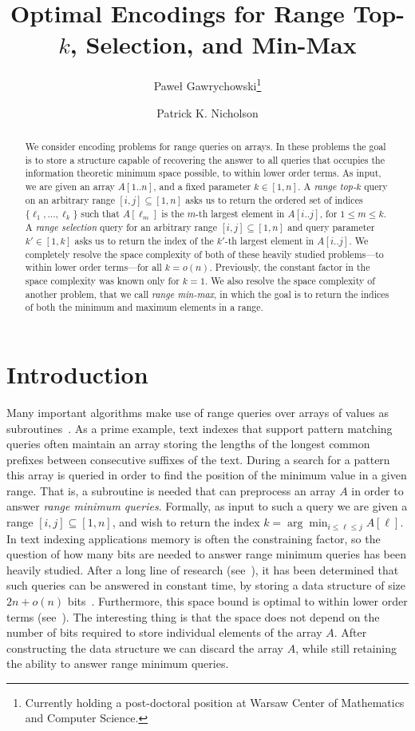 \documentclass[runningheads]{llncs}
\title{Optimal Encodings for Range Top-\texorpdfstring{$k$}{k},
  Selection, and Min-Max}
\author{Pawe{\l} Gawrychowski\inst{1}\thanks{Currently holding a post-doctoral position at Warsaw Center of Mathematics and Computer Science.}  \and Patrick K. Nicholson\inst{2}}
\institute{Institute of Informatics, University of Warsaw, Poland \and Max-Planck-Institut für Informatik, Saarbrücken, Germany}
\begin{document}
\pagestyle{plain}
\maketitle

\begin{abstract}
We consider encoding problems for range queries on arrays. In these
problems the goal is to store a structure capable of recovering the
answer to all queries that occupies the information theoretic minimum
space possible, to within lower order terms.  As input, we are given
an array $A[1..n]$, and a fixed parameter $k \in [1,n]$.  A
\emph{range top-$k$} query on an arbitrary range $[i,j] \subseteq
     [1,n]$ asks us to return the ordered set of indices $\{\ell_1,
     ..., \ell_{k}\}$ such that $A[\ell_m]$ is the $m$-th largest
     element in $A[i..j]$, for $1 \le m \le k$.  A \emph{range
       selection} query for an arbitrary range $[i,j] \subseteq [1,n]$
     and query parameter $k' \in [1,k]$ asks us to return the index of
     the $k'$-th largest element in $A[i..j]$.  We completely resolve
     the space complexity of both of these heavily studied
     problems---to within lower order terms---for all $k = o(n)$.
     Previously, the constant factor in the space complexity was known
     only for $k=1$.  We also resolve the space complexity of another
     problem, that we call \emph{range min-max}, in which the goal is
     to return the indices of both the minimum and maximum elements in
     a range.
\end{abstract}


\section{Introduction}

Many important algorithms make use of range queries over arrays of
values as subroutines~\cite{N13,S13}.  As a prime example, text
indexes that support pattern matching queries often maintain an array
storing the lengths of the longest common prefixes between consecutive
suffixes of the text.  During a search for a pattern this array is
queried in order to find the position of the minimum value in a given
range.  That is, a subroutine is needed that can preprocess an array
$A$ in order to answer \emph{range minimum queries}.  Formally, as
input to such a query we are given a range $[i,j] \subseteq [1,n]$,
and wish to return the index $k = \arg\min_{i \le \ell\le j}A[\ell]$.
In text indexing applications memory is often the constraining factor,
so the question of how many bits are needed to answer range minimum
queries has been heavily studied.  After a long line of research
(see~\cite{BFPSS05,S07}), it has been determined that such queries can
be answered in constant time, by storing a data structure of size $2n
+o(n)$ bits~\cite{FH11}.  Furthermore, this space bound is optimal to
within lower order terms (see~\cite[Sec.~1.1.2]{FH11}).  The
interesting thing is that the space does not depend on the number of
bits required to store individual elements of the array $A$.  After
constructing the data structure we can discard the array $A$, while
still retaining the ability to answer range minimum queries.
\end{document}
